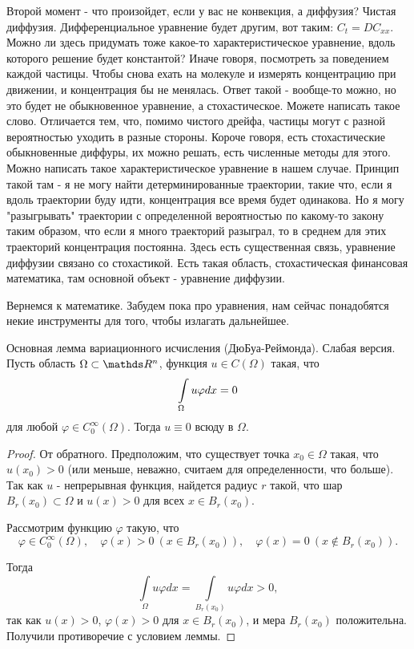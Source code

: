 Второй момент - что произойдет, если у вас не конвекция, а диффузия? Чистая диффузия. Дифференциальное
уравнение будет другим, вот таким: $C_t = DC_{xx}$. Можно ли здесь придумать тоже какое-то характеристическое
уравнение, вдоль которого решение будет константой? Иначе говоря, посмотреть за поведением каждой частицы.
Чтобы снова ехать на молекуле и измерять концентрацию при движении, и концентрация бы не менялась. Ответ такой
- вообще-то можно, но это будет не обыкновенное уравнение, а стохастическое. Можете написать такое слово.
Отличается тем, что, помимо чистого дрейфа, частицы могут с разной вероятностью уходить в разные стороны.
Короче говоря, есть стохастические обыкновенные диффуры, их можно решать, есть численные методы для этого.
Можно написать такое характеристическое уравнение в нашем случае. Принцип такой там - я не могу найти
детерминированные траектории, такие что, если я вдоль траектории буду идти, концентрация все время будет
одинакова. Но я могу "разыгрывать" траектории с определенной вероятностью по какому-то закону таким образом,
что если я много траекторий разыграл, то в среднем для этих траекторий концентрация постоянна. Здесь есть
существенная связь, уравнение диффузии связано со стохастикой. Есть такая область, стохастическая финансовая
математика, там основной объект - уравнение диффузии.

Вернемся к математике. Забудем пока про уравнения, нам сейчас понадобятся некие инструменты для того, чтобы
излагать дальнейшее.

\begin{lemma}{Основная лемма вариационного исчисления (ДюБуа-Реймонда). Слабая версия.}
Пусть область $\Omega \subset \real^n$, функция $u \in C(\Omega)$ такая, что 
$$\displaystyle \int \limits_{\Omega} u \varphi dx = 0$$ 
для любой $\varphi \in C_0^\infty(\Omega)$. Тогда $u \equiv 0$ всюду в $\Omega$.
\end{lemma}

\begin{proof}
От обратного. Предположим, что существует точка $x_0 \in \Omega$ такая, что $u(x_0) > 0$ (или меньше, неважно, считаем для определенности, что больше). 
Так как $u$ - непрерывная функция, найдется радиус $r$ такой, что шар $B_r(x_0) \subset \Omega$ и $u(x) > 0$ для всех $x \in B_r(x_0)$.

Рассмотрим функцию $\varphi$ такую, что 
$$\varphi \in C_0^\infty(\Omega),\quad \varphi(x) > 0 \ (x \in B_r(x_0)),\quad \varphi(x) = 0 \ (x \notin B_r(x_0)).$$

Тогда
$$\int \limits_{\Omega} u \varphi dx = \int \limits_{B_r(x_0)} u \varphi dx > 0,$$ 
так как $u(x) > 0$, $\varphi(x) > 0$ для $x \in B_r(x_0)$, и мера $B_r(x_0)$ положительна. Получили противоречие с условием леммы.
\end{proof}

